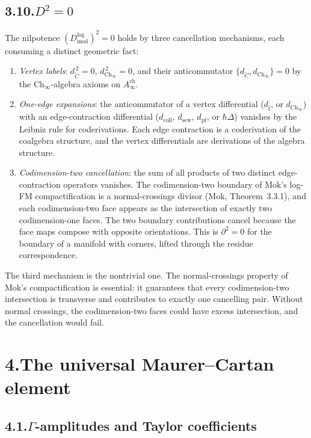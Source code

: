 \documentclass[11pt]{report}
\theoremstyle{definition}
\theoremstyle{remark}
\numberwithin{equation}{section}
\begin{document}
\subsection*{3.10.\enspace $D^2=0$}

The nilpotence $(D^{\log}_{\mathrm{mod}})^2=0$ holds by three
cancellation mechanisms, each consuming a distinct geometric fact:
\begin{enumerate}[label=(\roman*)]
\item \emph{Vertex labels}: $d_{\check C}^{\,2}=0$,
$d_{\mathrm{Ch}_\infty}^{\,2}=0$, and their anticommutator
$\{d_{\check C},d_{\mathrm{Ch}_\infty}\}=0$ by the
$\mathrm{Ch}_\infty$-algebra axioms on
$A^{\mathrm{ch}}_\infty$.
\item \emph{One-edge expansions}: the anticommutator of a
vertex differential ($d_{\check C}$ or
$d_{\mathrm{Ch}_\infty}$) with an edge-contraction differential
($d_{\mathrm{coll}}$, $d_{\mathrm{sew}}$, $d_{\mathrm{pf}}$,
or $\hbar\Delta$) vanishes by the Leibniz rule for coderivations.
Each edge contraction is a coderivation of the coalgebra
structure, and the vertex differentials are derivations of the
algebra structure.
\item \emph{Codimension-two cancellation}: the sum of all
products of two distinct edge-contraction operators vanishes.
The codimension-two boundary of
Mok's log-FM compactification is a normal-crossings divisor
(Mok, Theorem~3.3.1), and each codimension-two face appears as
the intersection of exactly two codimension-one faces. The
two boundary contributions cancel because the face maps compose
with opposite orientations. This is $\partial^2=0$ for the
boundary of a manifold with corners, lifted through the
residue correspondence.
\end{enumerate}

The third mechanism is the nontrivial one. The normal-crossings
property of Mok's compactification is essential: it guarantees
that every codimension-two intersection is transverse and
contributes to exactly one cancelling pair. Without normal crossings,
the codimension-two faces could have excess intersection, and the
cancellation would fail.
\section*{4.\quad The universal Maurer--Cartan element}

\subsection*{4.1.\enspace $\Gamma$-amplitudes and Taylor coefficients}
\end{document}
